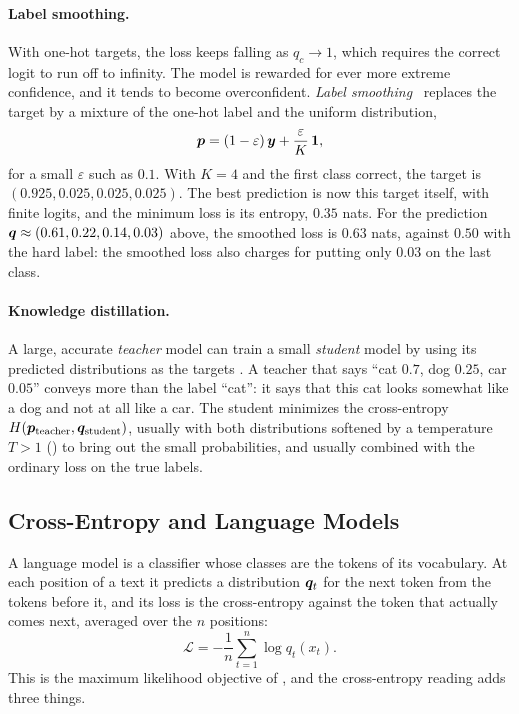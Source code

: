 \paragraph{Label smoothing.}
With one-hot targets, the loss keeps falling as $q_c \to 1$, which
requires the correct logit to run off to infinity. The model is rewarded
for ever more extreme confidence, and it tends to become overconfident.
\emph{Label smoothing}~\cite{szegedy2016rethinking} replaces the target
by a mixture of the one-hot label and the uniform distribution,
\[
  \bm{p} = (1 - \varepsilon)\, \bm{y} + \frac{\varepsilon}{K}\,\bm{1},
\]
for a small $\varepsilon$ such as $0.1$. With $K = 4$ and the first class
correct, the target is $(0.925, 0.025, 0.025, 0.025)$. The best
prediction is now this target itself, with finite logits, and the
minimum loss is its entropy, $0.35$ nats. For the prediction $\bm{q}
\approx (0.61, 0.22, 0.14, 0.03)$ above, the smoothed loss is $0.63$
nats, against $0.50$ with the hard label: the smoothed loss also charges
for putting only $0.03$ on the last class.

\paragraph{Knowledge distillation.}
A large, accurate \emph{teacher} model can train a small \emph{student}
model by using its predicted distributions as the targets
\cite{hinton2015distilling}. A teacher that says ``cat $0.7$, dog
$0.25$, car $0.05$'' conveys more than the label ``cat'': it says that
this cat looks somewhat like a dog and not at all like a car. The student
minimizes the cross-entropy $H(\bm{p}_{\text{teacher}},
\bm{q}_{\text{student}})$, usually with both distributions softened by
a temperature $T > 1$ () to bring out the
small probabilities, and usually combined with the ordinary loss on the
true labels.

\subsection{Cross-Entropy and Language Models}
\label{sec:ch07-ce-lm}

A language model is a classifier whose classes are the tokens of its
vocabulary. At each position of a text it predicts a distribution
$\bm{q}_t$ for the next token from the tokens before it, and its loss
is the cross-entropy against the token that actually comes next,
averaged over the $n$ positions:
\[
  \mathcal{L} = -\frac{1}{n} \sum_{t=1}^{n} \log q_t(x_t) .
\]
This is the maximum likelihood objective of , and
the cross-entropy reading adds three things.

